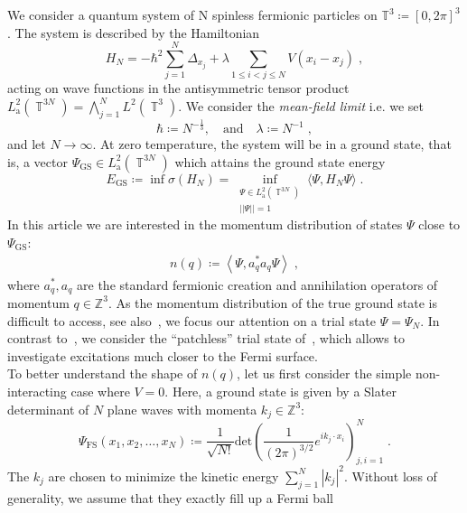 \documentclass[12pt,a4paper]{article}
\numberwithin{equation}{section}
\newcommand{\ZZZ}{\mathbb{Z}}
\newcommand{\1}{\mathbb{I}}
\newcommand{\FS}{\mathrm{FS}}
\newcommand{\GS}{\mathrm{GS}}
\DeclareMathOperator{\T}{\mathbb{T}}
\newcommand{\eva}[1]{\left\langle #1 \right\rangle}
\theoremstyle{plain}
\theoremstyle{definition}
\theoremstyle{remark}
\theoremstyle{plain}
\theoremstyle{definition}
\theoremstyle{remark}
\begin{document}
We consider a quantum system of N spinless fermionic particles on $\mathbb{T}^3\coloneq [0,2\pi]^3$. The system is described by the Hamiltonian
\begin{equation}
	H_N = -\hbar^2\sum\limits_{j=1}^{N}\Delta_{x_j} + \lambda\!\!\!\sum\limits_{1\leq i < j \leq N } V(x_i - x_j) \;,
\end{equation}
acting on wave functions in the antisymmetric tensor product $L^2_{\mathrm{a}}(\T^{3N}) = \bigwedge_{j=1}^N L^2(\T^3)$.
We consider the \textit{mean-field limit} i.e. we set
\begin{equation}
	\hbar\coloneq N^{-\frac{1}{3}}, \quad\text{and}\quad \lambda \coloneq N^{-1} \;,
\end{equation}
and let $ N \to \infty $. At zero temperature, the system will be in a ground state, that is, a vector $ \Psi_{\GS} \in L^2_{\mathrm{a}}(\T^{3N}) $ which attains the ground state energy
\begin{equation} \label{eq:EGS}
	E_{\GS}
	\coloneq \inf \sigma(H_N)
	= \inf_{\substack{\Psi \in L^2_{\mathrm{a}}(\T^{3N}) \\||\Psi|| = 1}} \langle \Psi, H_N \Psi \rangle \;.
\end{equation}
In this article we are interested in the momentum distribution of states $ \Psi $ close to $ \Psi_{\GS} $:
\begin{align}
	n(q) \coloneq \eva{\Psi, a^*_q a_q \Psi} \;,
\end{align}
where $ a_q^*, a_q $ are the standard fermionic creation and annihilation operators of momentum $ q \in \ZZZ^3 $. As the momentum distribution of the true ground state is difficult to access, see also~\cite[Sect.~1]{BL25}, we focus our attention on a trial state $ \Psi = \Psi_N $. In contrast to~\cite{BL25}, we consider the ``patchless'' trial state of~\cite{CHN23}, which allows to investigate excitations much closer to the Fermi surface.\\
To better understand the shape of $ n(q) $, let us first consider the simple non-interacting case where $ V=0 $. Here, a ground state is given by a Slater determinant of $ N $ plane waves with momenta $ k_j \in \ZZZ^3 $:
\begin{equation}
	\Psi_{\FS}(x_1, x_2, \ldots, x_N) \coloneq \frac{1}{\sqrt{N!}}\text{det}\left(\frac{1}{(2\pi)^{3/2}}e^{ik_j\cdot x_i}\right)^N_{j,i=1} \;.
\end{equation}
The $ k_j $ are chosen to minimize the kinetic energy $ \sum_{j=1}^N |k_j|^2 $. Without loss of generality, we assume that they exactly fill up a Fermi ball
\end{document}
